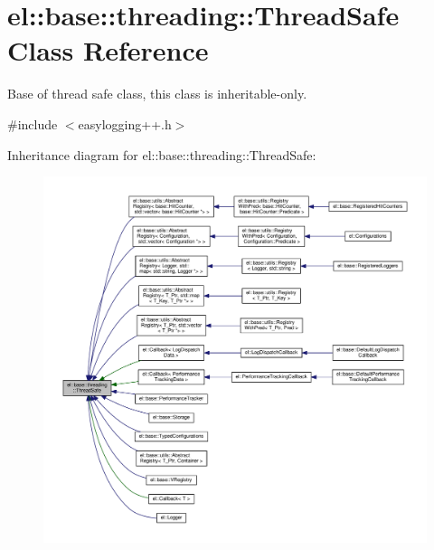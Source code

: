 \hypertarget{classel_1_1base_1_1threading_1_1_thread_safe}{}\section{el\+:\+:base\+:\+:threading\+:\+:Thread\+Safe Class Reference}
\label{classel_1_1base_1_1threading_1_1_thread_safe}


Base of thread safe class, this class is inheritable-\/only.  




{\ttfamily \#include $<$easylogging++.\+h$>$}



Inheritance diagram for el\+:\+:base\+:\+:threading\+:\+:Thread\+Safe\+:
\nopagebreak
\begin{figure}[H]
\begin{center}
\leavevmode
\includegraphics[width=350pt]{classel_1_1base_1_1threading_1_1_thread_safe__inherit__graph}
\end{center}
\end{figure}

